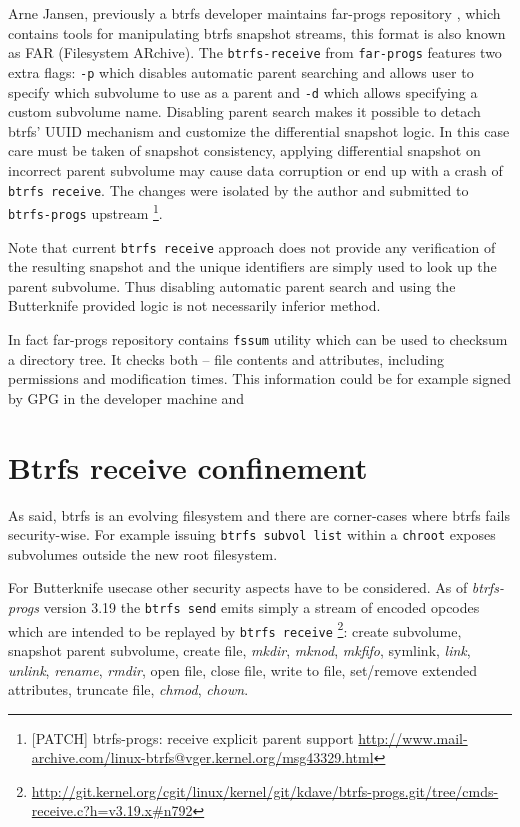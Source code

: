 \documentclass[a4paper,11pt]{kth-mag}
\begin{document}
Arne Jansen, previously a \acrshort{btrfs} developer maintains far-progs repository
\cite{far-progs},
which contains tools for manipulating \acrshort{btrfs} snapshot streams,
this format is also known as FAR (Filesystem ARchive).
The \lstinline!btrfs-receive! from \lstinline!far-progs! features
two extra flags: \lstinline!-p! which disables
automatic parent searching and allows user to specify which
subvolume to use as a parent and \lstinline!-d! which
allows specifying a custom subvolume name.
Disabling parent search makes it possible to detach
\acrshort{btrfs}' UUID mechanism and customize the differential snapshot logic.
In this case care must be taken of snapshot consistency,
applying differential snapshot on incorrect parent subvolume
may cause data corruption or end up with a crash
of \lstinline!btrfs receive!.
The changes were isolated by the author and
submitted to \lstinline!btrfs-progs! upstream
\footnote{
[PATCH] btrfs-progs: receive explicit parent support
\url{http://www.mail-archive.com/linux-btrfs@vger.kernel.org/msg43329.html}}.

Note that current \lstinline!btrfs receive! approach does not provide
any verification of the resulting snapshot and the unique
identifiers are simply used to look up the parent subvolume.
Thus disabling automatic parent search and
using the Butterknife provided logic
is not necessarily inferior method.

In fact far-progs repository contains \lstinline!fssum!
utility which can be used to checksum a directory tree.
It checks both -- file contents and attributes,
including permissions and modification times.
This information could be for example signed by GPG
in the developer machine and


\section{Btrfs receive confinement}

As said, \acrshort{btrfs} is an evolving filesystem and there
are corner-cases where \acrshort{btrfs} fails security-wise.
For example issuing \lstinline!btrfs subvol list! within
a \lstinline!chroot! exposes subvolumes outside the new root filesystem.

For Butterknife usecase other security aspects have to be considered.
As of \emph{btrfs-progs} version 3.19 the \lstinline!btrfs send!
emits simply a stream of encoded opcodes
which are intended to be replayed by \lstinline!btrfs receive!
\footnote{\url{http://git.kernel.org/cgit/linux/kernel/git/kdave/btrfs-progs.git/tree/cmds-receive.c?h=v3.19.x\#n792}}:
create subvolume, snapshot parent subvolume,
create file, \emph{mkdir}, \emph{mknod}, \emph{mkfifo}, symlink,
\emph{link}, \emph{unlink}, \emph{rename}, \emph{rmdir}, open file,
close file, write to file, set/remove extended attributes,
truncate file, \emph{chmod}, \emph{chown}.
\end{document}
